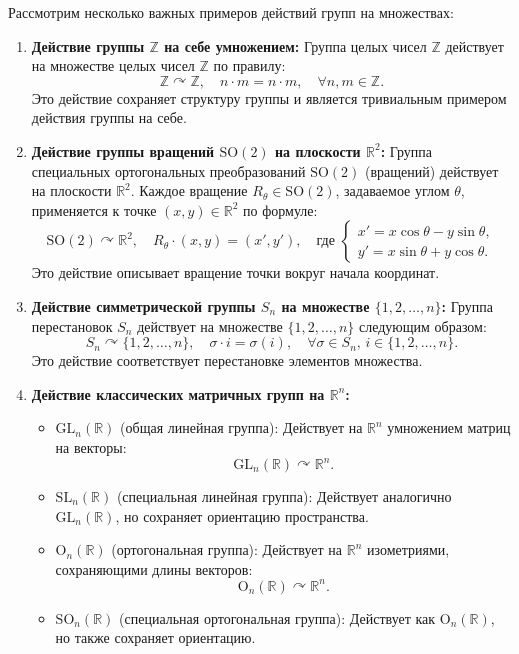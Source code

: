 \begin{example}
	Рассмотрим несколько важных примеров действий групп на множествах:
	
	\begin{enumerate}
		\item \textbf{Действие группы $ \mathbb{Z} $ на себе умножением:}
		Группа целых чисел $ \mathbb{Z} $ действует на множестве целых чисел $ \mathbb{Z} $ по правилу:
		\[
		\mathbb{Z} \curvearrowright \mathbb{Z}, \quad n \cdot m = n \cdot m, \quad \forall n, m \in \mathbb{Z}.
		\]
		Это действие сохраняет структуру группы и является тривиальным примером действия группы на себе.
	
		\item \textbf{Действие группы вращений $ \mathrm{SO}(2) $ на плоскости $ \mathbb{R}^2 $:}
		Группа специальных ортогональных преобразований $ \mathrm{SO}(2) $ (вращений) действует на плоскости $ \mathbb{R}^2 $. Каждое вращение $ R_\theta \in \mathrm{SO}(2) $, задаваемое углом $ \theta $, применяется к точке $ (x, y) \in \mathbb{R}^2 $ по формуле:
		\[
		\mathrm{SO}(2) \curvearrowright \mathbb{R}^2, \quad R_\theta \cdot (x, y) = (x', y'), \quad \text{где } 
		\begin{cases}
		x' = x \cos \theta - y \sin \theta, \\
		y' = x \sin \theta + y \cos \theta.
		\end{cases}
		\]
		Это действие описывает вращение точки вокруг начала координат.
	
		\item \textbf{Действие симметрической группы $ S_n $ на множестве $ \{1, 2, \ldots, n\} $:}
		Группа перестановок $ S_n $ действует на множестве $ \{1, 2, \ldots, n\} $ следующим образом:
		\[
		S_n \curvearrowright \{1, 2, \ldots, n\}, \quad \sigma \cdot i = \sigma(i), \quad \forall \sigma \in S_n, \, i \in \{1, 2, \ldots, n\}.
		\]
		Это действие соответствует перестановке элементов множества.
	
		\item \textbf{Действие классических матричных групп на $ \mathbb{R}^n $:}
		\begin{itemize}
			\item $ \mathrm{GL}_n(\mathbb{R}) $ (общая линейная группа): Действует на $ \mathbb{R}^n $ умножением матриц на векторы:
			\[
			\mathrm{GL}_n(\mathbb{R}) \curvearrowright \mathbb{R}^n.
			\]
			\item $ \mathrm{SL}_n(\mathbb{R}) $ (специальная линейная группа): Действует аналогично $ \mathrm{GL}_n(\mathbb{R}) $, но сохраняет ориентацию пространства.
			\item $ \mathrm{O}_n(\mathbb{R}) $ (ортогональная группа): Действует на $ \mathbb{R}^n $ изометриями, сохраняющими длины векторов:
			\[
			\mathrm{O}_n(\mathbb{R}) \curvearrowright \mathbb{R}^n.
			\]
			\item $ \mathrm{SO}_n(\mathbb{R}) $ (специальная ортогональная группа): Действует как $ \mathrm{O}_n(\mathbb{R}) $, но также сохраняет ориентацию.
		\end{itemize}
	

\end{enumerate}
\end{example}
